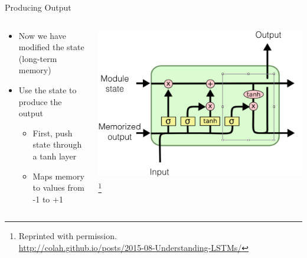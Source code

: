 \documentclass[aspectratio=169]{beamer}
\begin{document}
\begin{frame}{Producing Output}

\begin{columns}
\begin{column}{0.5\textwidth}
\begin{itemize}
	\item Now we have modified the state (long-term memory)
	\item Use the state to produce the output
	\begin{itemize}
		\item First, push state through a tanh layer
		\item Maps memory to values from -1 to +1
	\end{itemize}
\end{itemize}
\end{column}
\begin{column}{0.5\textwidth}
\includegraphics[width=1\textwidth]{lectLSTM/output.png}
\footnote{Reprinted with permission.\\ \hspace{1.7em}\url{http://colah.github.io/posts/2015-08-Understanding-LSTMs/}}
\end{column}
\end{columns}
\end{frame}
\end{document}
